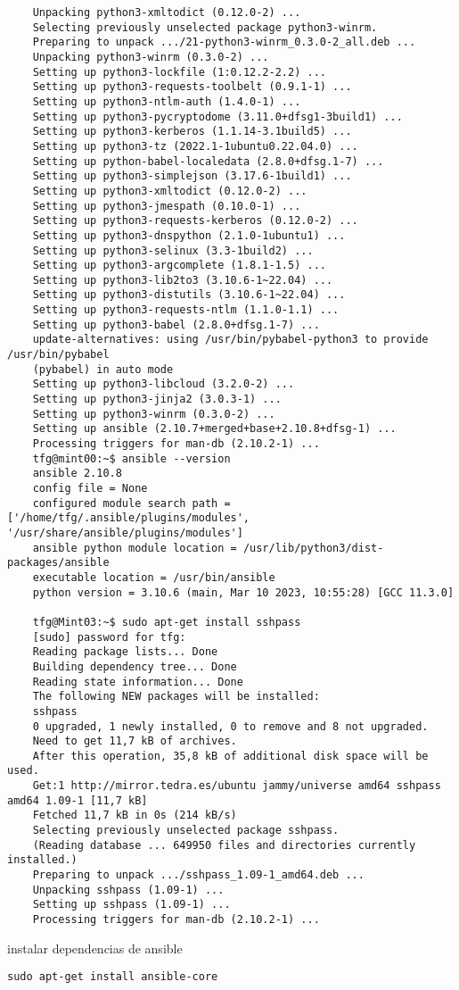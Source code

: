 \documentclass[../main.tex]{subfiles}
\begin{document}
\begin{lstlisting}
	Unpacking python3-xmltodict (0.12.0-2) ...
	Selecting previously unselected package python3-winrm.
	Preparing to unpack .../21-python3-winrm_0.3.0-2_all.deb ...
	Unpacking python3-winrm (0.3.0-2) ...
	Setting up python3-lockfile (1:0.12.2-2.2) ...
	Setting up python3-requests-toolbelt (0.9.1-1) ...
	Setting up python3-ntlm-auth (1.4.0-1) ...
	Setting up python3-pycryptodome (3.11.0+dfsg1-3build1) ...
	Setting up python3-kerberos (1.1.14-3.1build5) ...
	Setting up python3-tz (2022.1-1ubuntu0.22.04.0) ...
	Setting up python-babel-localedata (2.8.0+dfsg.1-7) ...
	Setting up python3-simplejson (3.17.6-1build1) ...
	Setting up python3-xmltodict (0.12.0-2) ...
	Setting up python3-jmespath (0.10.0-1) ...
	Setting up python3-requests-kerberos (0.12.0-2) ...
	Setting up python3-dnspython (2.1.0-1ubuntu1) ...
	Setting up python3-selinux (3.3-1build2) ...
	Setting up python3-argcomplete (1.8.1-1.5) ...
	Setting up python3-lib2to3 (3.10.6-1~22.04) ...
	Setting up python3-distutils (3.10.6-1~22.04) ...
	Setting up python3-requests-ntlm (1.1.0-1.1) ...
	Setting up python3-babel (2.8.0+dfsg.1-7) ...
	update-alternatives: using /usr/bin/pybabel-python3 to provide /usr/bin/pybabel 
	(pybabel) in auto mode
	Setting up python3-libcloud (3.2.0-2) ...
	Setting up python3-jinja2 (3.0.3-1) ...
	Setting up python3-winrm (0.3.0-2) ...
	Setting up ansible (2.10.7+merged+base+2.10.8+dfsg-1) ...
	Processing triggers for man-db (2.10.2-1) ...
	tfg@mint00:~$ ansible --version
	ansible 2.10.8
	config file = None
	configured module search path = ['/home/tfg/.ansible/plugins/modules', '/usr/share/ansible/plugins/modules']
	ansible python module location = /usr/lib/python3/dist-packages/ansible
	executable location = /usr/bin/ansible
	python version = 3.10.6 (main, Mar 10 2023, 10:55:28) [GCC 11.3.0]
	
	tfg@Mint03:~$ sudo apt-get install sshpass
	[sudo] password for tfg:        
	Reading package lists... Done
	Building dependency tree... Done
	Reading state information... Done
	The following NEW packages will be installed:
	sshpass
	0 upgraded, 1 newly installed, 0 to remove and 8 not upgraded.
	Need to get 11,7 kB of archives.
	After this operation, 35,8 kB of additional disk space will be used.
	Get:1 http://mirror.tedra.es/ubuntu jammy/universe amd64 sshpass amd64 1.09-1 [11,7 kB]
	Fetched 11,7 kB in 0s (214 kB/s)    
	Selecting previously unselected package sshpass.
	(Reading database ... 649950 files and directories currently installed.)
	Preparing to unpack .../sshpass_1.09-1_amd64.deb ...
	Unpacking sshpass (1.09-1) ...
	Setting up sshpass (1.09-1) ...
	Processing triggers for man-db (2.10.2-1) ...
\end{lstlisting}
instalar dependencias de ansible
\begin{lstlisting}
sudo apt-get install ansible-core
\end{lstlisting}
\end{document}
